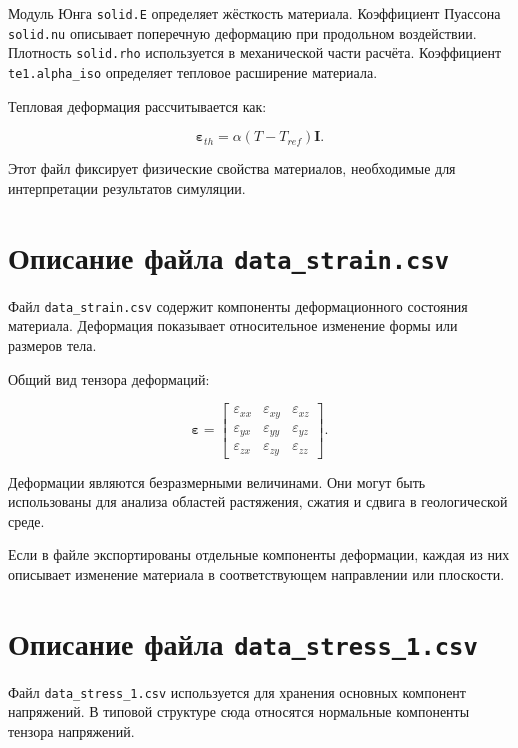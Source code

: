 Модуль Юнга \texttt{solid.E} определяет жёсткость материала. Коэффициент Пуассона \texttt{solid.nu} описывает поперечную деформацию при продольном воздействии. Плотность \texttt{solid.rho} используется в механической части расчёта. Коэффициент \texttt{te1.alpha\_iso} определяет тепловое расширение материала.

Тепловая деформация рассчитывается как:

\begin{equation}
\boldsymbol{\varepsilon}_{th}=\alpha(T-T_{ref})\mathbf{I}.
\end{equation}

Этот файл фиксирует физические свойства материалов, необходимые для интерпретации результатов симуляции.

\section{Описание файла \texttt{data\_strain.csv}}

Файл \texttt{data\_strain.csv} содержит компоненты деформационного состояния материала. Деформация показывает относительное изменение формы или размеров тела.

Общий вид тензора деформаций:

\begin{equation}
\boldsymbol{\varepsilon}=\begin{bmatrix}
\varepsilon_{xx} & \varepsilon_{xy} & \varepsilon_{xz} \\
\varepsilon_{yx} & \varepsilon_{yy} & \varepsilon_{yz} \\
\varepsilon_{zx} & \varepsilon_{zy} & \varepsilon_{zz}
\end{bmatrix}.
\end{equation}

Деформации являются безразмерными величинами. Они могут быть использованы для анализа областей растяжения, сжатия и сдвига в геологической среде.

Если в файле экспортированы отдельные компоненты деформации, каждая из них описывает изменение материала в соответствующем направлении или плоскости.

\section{Описание файла \texttt{data\_stress\_1.csv}}

Файл \texttt{data\_stress\_1.csv} используется для хранения основных компонент напряжений. В типовой структуре сюда относятся нормальные компоненты тензора напряжений.

